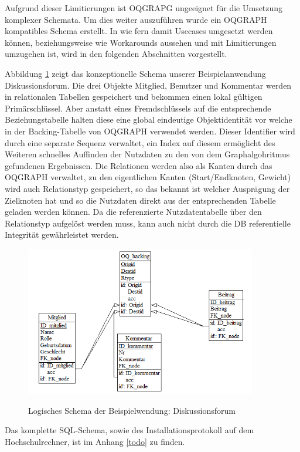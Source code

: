 Aufgrund dieser Limitierungen ist OQGRAPG ungeeignet für die Umsetzung komplexer Schemata. Um dies weiter auszuführen wurde ein OQGRAPH kompatibles Schema erstellt. In wie fern damit Usecases umgesetzt werden können, beziehungsweise wie Workarounds aussehen und mit Limitierungen umzugehen ist, wird in den folgenden Abschnitten vorgestellt.

Abbildung \ref{fig:logicSchema} zeigt das konzeptionelle Schema unserer Beispielanwendung Diskussionsforum. Die drei Objekte Mitglied, Benutzer und Kommentar werden in relationalen Tabellen gespeichert und bekommen einen lokal gültigen Primärschlüssel. Aber anstatt eines Fremdschlüssels auf die entsprechende Beziehungstabelle halten diese eine global eindeutige Objektidentität vor welche in der Backing-Tabelle von OQGRAPH verwendet werden. Dieser Identifier wird durch eine separate Sequenz verwaltet, ein Index auf diesem ermöglicht des Weiteren schnelles Auffinden der Nutzdaten zu den von dem Graphalgohritmus gefundenen Ergebnissen. Die Relationen werden also als Kanten durch das OQGRAPH verwaltet, zu den eigentlichen Kanten (Start/Endknoten, Gewicht) wird auch Relationstyp gespeichert, so das bekannt ist welcher Ausprägung der Zielknoten hat und so die Nutzdaten direkt aus der entsprechenden Tabelle geladen werden können. Da die referenzierte Nutzdatentabelle über den Relationstyp aufgelöst werden muss, kann auch nicht durch die DB referentielle 
Integrität gewährleistet werden.

\begin{figure}
	\caption{Logisches Schema der Beispielwendung: Diskussionsforum}
	\centering
	\includegraphics[width=0.9\textwidth]{images/logischesSchema.png}
	\label{fig:logicSchema}
\end{figure}
 
Das komplette SQL-Schema, sowie des Installationsprotokoll auf dem Hochschulrechner, ist im Anhang \ref{todo} zu finden.

